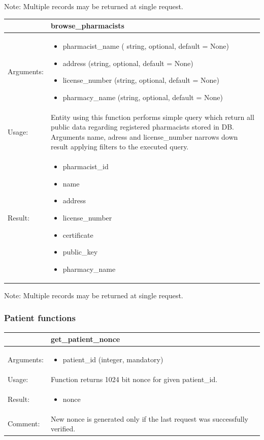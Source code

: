 Note: Multiple records may be returned at single request.


    \begin{longtable}{| p{6cm} | p{7.75cm} |}
    \hline
     & browse\_pharmacists \\ \hline
    Arguments: &  \begin{itemize}
    	\item pharmacist\_name ( string, optional, default = None)
		\item address (string, optional, default = None)
		\item license\_number (string, optional, default = None)
		\item pharmacy\_name (string, optional, default = None)

	\end{itemize}     \\ \hline
    Usage: & Entity using this function performs simple query which return all public data regarding registered pharmacists stored in DB. Arguments name, adress and license\_number narrows down result applying filters to the executed query. \\ \hline
    Result: & \begin{itemize}
    	\item pharmacist\_id
		\item name
		\item address
		\item license\_number
		\item certificate
		\item public\_key
		\item pharmacy\_name
	\end{itemize}     \\ \hline	
    \end{longtable}
Note: Multiple records may be returned at single request.

\subsubsection{Patient functions}


    \begin{longtable}{| p{6cm} | p{7.75cm} |}
    \hline
     & get\_patient\_nonce \\ \hline
    Arguments: &  \begin{itemize}
    	\item patient\_id (integer, mandatory)
	\end{itemize}     \\ \hline
    Usage: & Function returns 1024 bit nonce for given patient\_id. \\ \hline
    Result: & \begin{itemize}
    	\item nonce
	\end{itemize}     \\ \hline	
			Comment: & New nonce is generated only if the last request was successfully verified.\\ \hline
    \end{longtable}


